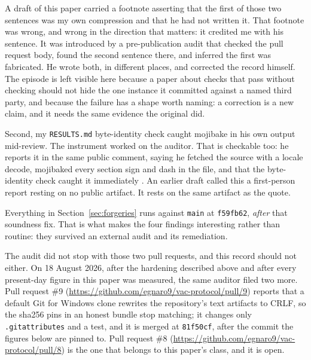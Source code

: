 \documentclass[11pt]{article}
\begin{document}
A draft of this paper carried a footnote asserting that the first of those two
sentences was my own compression and that he had not written it. That footnote was wrong, and
wrong in the direction that matters: it credited me with his sentence. It was introduced by a
pre-publication audit that checked the pull request body, found the second sentence there, and
inferred the first was fabricated. He wrote both, in different places, and corrected the record
himself. The episode is left visible here because a paper about checks that pass without
checking should not hide the one instance it committed against a named third party, and because
the failure has a shape worth naming: a correction is a new claim, and it needs the same
evidence the original did.

Second, my \texttt{RESULTS.md} byte-identity check caught mojibake in his own output
mid-review. The instrument worked on the auditor. That is checkable too: he reports it in the
same public comment, saying he fetched the source with a locale decode, mojibaked every section
sign and dash in the file, and that the byte-identity check caught it immediately
\citep{derme2026devto}. An earlier draft called this a first-person report resting on no public
artifact. It rests on the same artifact as the quote.

Everything in Section~\ref{sec:forgeries} runs against \texttt{main} at \texttt{f59fb62},
\emph{after} that soundness fix. That is what makes the four findings interesting rather
than routine: they survived an external audit and its remediation.

The audit did not stop with those two pull requests, and this record should not either. On
18 August 2026, after the hardening described above and after every present-day figure in
this paper was measured, the same auditor filed two more. Pull request \#9
(\url{https://github.com/egnaro9/vac-protocol/pull/9}) reports that a default Git for
Windows clone rewrites the repository's text artifacts to CRLF, so the sha256 pins in an
honest bundle stop matching; it changes only \texttt{.gitattributes} and a test, and it is
merged at \texttt{81f50cf}, after the commit the figures below are pinned to. Pull request
\#8 (\url{https://github.com/egnaro9/vac-protocol/pull/8}) is the one that belongs to this
paper's class, and it is open.
\end{document}
